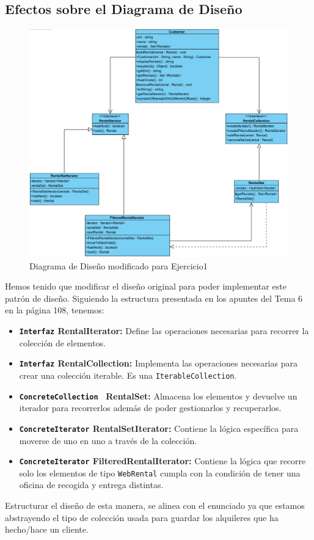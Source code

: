 \subsection{Efectos sobre el Diagrama de Diseño}
\begin{figure}[H]
    \centering
     \includegraphics[width=0.70\linewidth]{assets/diagramas/UML_Apartado1.png}
     \caption{Diagrama de Diseño modificado para Ejercicio1}
\end{figure}
\vspace{0.50cm}
Hemos tenido que modificar el diseño original para poder implementar este patrón de diseño. Siguiendo la estructura presentada en los apuntes del Tema 6 en la página 108, tenemos:
\begin{itemize}
    \item \textbf{\texttt{Interfaz} RentalIterator:} Define las operaciones necesarias para recorrer la colección de elementos.
    \item \textbf{\texttt{Interfaz} RentalCollection:} Implementa las operaciones necesarias para crear una colección iterable. Es una \texttt{IterableCollection}.
    \item \textbf{\texttt{ConcreteCollection } RentalSet:} Almacena los elementos y devuelve un iterador para recorrerlos además de poder gestionarlos y recuperarlos.
    \item \textbf{\texttt{ConcreteIterator} RentalSetIterator:} Contiene la lógica específica para moverse de uno en uno a través de la colección.
    \item \textbf{\texttt{ConcreteIterator} FilteredRentalIterator:} Contiene la lógica que recorre solo los elementos de tipo \texttt{WebRental} cumpla con la condición de tener una oficina de recogida y entrega distintas.
\end{itemize}
\vspace{0.15cm}
Estructurar el diseño de esta manera, se alinea con el enunciado ya que estamos abstrayendo el tipo de colección usada para guardar los alquileres que ha hecho/hace un cliente.

